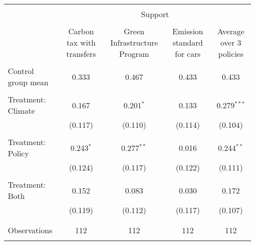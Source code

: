 
\begin{tabular}{@{\extracolsep{5pt}}lcccc} 
\\[-1.8ex]\hline 
\hline \\[-1.8ex] 
 & \multicolumn{4}{c}{Support} \\ 
\cline{2-5} 
\\[-1.8ex] & Carbon tax with transfers & Green Infrastructure Program & Emission standard for cars & Average over 3 policies \\ 
\hline \\[-1.8ex] 
 Control group mean & 0.333 & 0.467 & 0.433 & 0.433  \\ \hline \\[-1.8ex] Treatment: Climate & 0.167 & 0.201$^{*}$ & 0.133 & 0.279$^{***}$ \\ 
  & (0.117) & (0.110) & (0.114) & (0.104) \\ 
  & & & & \\ 
 Treatment: Policy & 0.243$^{*}$ & 0.277$^{**}$ & 0.016 & 0.244$^{**}$ \\ 
  & (0.124) & (0.117) & (0.122) & (0.111) \\ 
  & & & & \\ 
 Treatment: Both & 0.152 & 0.083 & 0.030 & 0.172 \\ 
  & (0.119) & (0.112) & (0.117) & (0.107) \\ 
  & & & & \\ 
\hline \\[-1.8ex] 

Observations & 112 & 112 & 112 & 112 \\ 
\hline 
\hline \\[-1.8ex] 
\end{tabular} 